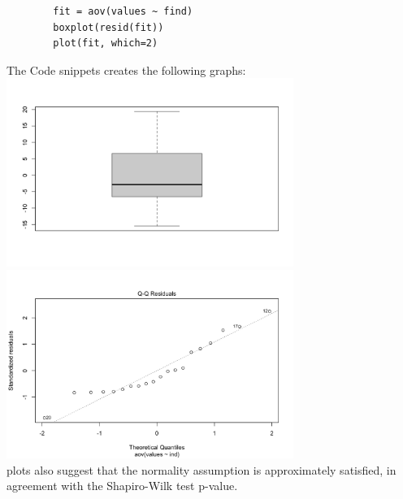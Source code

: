 \documentclass[12pt,letterpaper, onecolumn]{exam}
\begin{document}
\begin{questions}
\begin{solution}
    \begin{verbatim}
        fit = aov(values ~ find)
        boxplot(resid(fit))
        plot(fit, which=2)
        \end{verbatim}
       The Code snippets creates the following graphs:\\
    \center
    \includegraphics[width=0.7\textwidth]{Homeworks/Graph1HW3.png}\\
    \includegraphics[width=0.7\textwidth]{Homeworks/Graph2HW3.png}\\
    plots also suggest that the normality assumption is approximately satisfied, in agreement with the Shapiro-Wilk test p-value.
    \end{solution}

    \pagebreak %
    
    
\end{questions}
\end{document}
